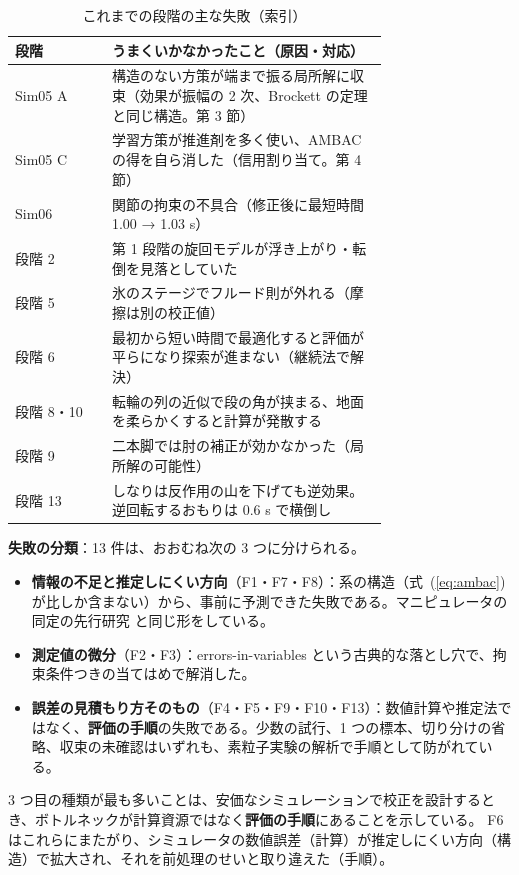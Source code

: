 \documentclass[paper=a4paper,fontsize=10pt,twocolumn,column_gap=2zw,line_length=24zw,number_of_lines=46,head_space=20mm]{jlreq}
\begin{document}
\begin{table}[t]\centering\footnotesize
\caption{これまでの段階の主な失敗（索引）}\label{tab:failidx}
\setlength{\tabcolsep}{2pt}
\begin{tabular}{lp{0.74\linewidth}}\toprule
段階 & うまくいかなかったこと（原因・対応） \\\midrule
Sim05 A & 構造のない方策が端まで振る局所解に収束（効果が振幅の 2 次、Brockett の定理と同じ構造。第 3 節） \\
Sim05 C & 学習方策が推進剤を多く使い、AMBAC の得を自ら消した（信用割り当て。第 4 節） \\
Sim06 & 関節の拘束の不具合（修正後に最短時間 1.00 → 1.03 s） \\
段階 2 & 第 1 段階の旋回モデルが浮き上がり・転倒を見落としていた \\
段階 5 & 氷のステージでフルード則が外れる（摩擦は別の校正値） \\
段階 6 & 最初から短い時間で最適化すると評価が平らになり探索が進まない（継続法で解決） \\
段階 8・10 & 転輪の列の近似で段の角が挟まる、地面を柔らかくすると計算が発散する \\
段階 9 & 二本脚では肘の補正が効かなかった（局所解の可能性） \\
段階 13 & しなりは反作用の山を下げても逆効果。逆回転するおもりは 0.6 s で横倒し \\\bottomrule
\end{tabular}
\end{table}

\textbf{失敗の分類}：13 件は、おおむね次の 3 つに分けられる。
\begin{itemize}\setlength{\itemsep}{0pt}
\item \textbf{情報の不足と推定しにくい方向}（F1・F7・F8）：系の構造（式~(\ref{eq:ambac}) が比しか含まない）から、事前に予測できた失敗である。マニピュレータの同定の先行研究 \cite{gautier1990} と同じ形をしている。
\item \textbf{測定値の微分}（F2・F3）：errors-in-variables という古典的な落とし穴で、拘束条件つきの当てはめで解消した。
\item \textbf{誤差の見積もり方そのもの}（F4・F5・F9・F10・F13）：数値計算や推定法ではなく、\textbf{評価の手順}の失敗である。少数の試行、1 つの標本、切り分けの省略、収束の未確認はいずれも、素粒子実験の解析で手順として防がれている。
\end{itemize}
3 つ目の種類が最も多いことは、安価なシミュレーションで校正を設計するとき、ボトルネックが計算資源ではなく\textbf{評価の手順}にあることを示している。
F6 はこれらにまたがり、シミュレータの数値誤差（計算）が推定しにくい方向（構造）で拡大され、それを前処理のせいと取り違えた（手順）。
\end{document}
